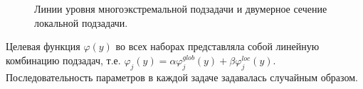 \documentclass[11pt, oneside, a4paper]{article}
\begin{document}
\begin{figure}[h!]
\begin{minipage}{0.5\linewidth}
\end{minipage}
\begin{minipage}{0.5\linewidth}
\end{minipage}
\caption{Линии уровня многоэкстремальной подзадачи и двумерное сечение локальной подзадачи.}
\label{fig}
\end{figure}
Целевая функция $\varphi(y)$ во всех наборах представляла собой линейную комбинацию подзадач, т.е. $\varphi_j(y) = \alpha \varphi_j^{glob}(y) + \beta \varphi_j^{loc}(y)$. Последовательность параметров в каждой задаче задавалась случайным образом. 
\end{document}
